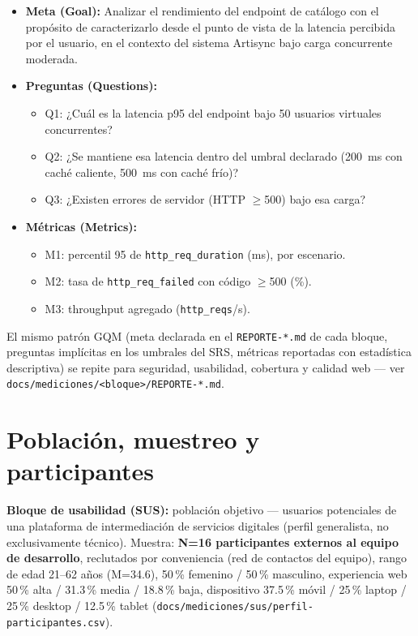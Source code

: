 \begin{itemize}
  \item \textbf{Meta (Goal):} Analizar el rendimiento del endpoint de
    catálogo con el propósito de caracterizarlo desde el punto de vista
    de la latencia percibida por el usuario, en el contexto del sistema
    Artisync bajo carga concurrente moderada.
  \item \textbf{Preguntas (Questions):}
    \begin{itemize}
      \item Q1: ¿Cuál es la latencia p95 del endpoint bajo 50 usuarios
        virtuales concurrentes?
      \item Q2: ¿Se mantiene esa latencia dentro del umbral declarado
        (200~ms con caché caliente, 500~ms con caché frío)?
      \item Q3: ¿Existen errores de servidor (HTTP $\geq$500) bajo esa
        carga?
    \end{itemize}
  \item \textbf{Métricas (Metrics):}
    \begin{itemize}
      \item M1: percentil 95 de \texttt{http\_req\_duration} (ms), por
        escenario.
      \item M2: tasa de \texttt{http\_req\_failed} con código $\geq$500
        (\%).
      \item M3: throughput agregado (\texttt{http\_reqs}/s).
    \end{itemize}
\end{itemize}

El mismo patrón GQM (meta declarada en el \texttt{REPORTE-*.md} de cada
bloque, preguntas implícitas en los umbrales del SRS, métricas reportadas
con estadística descriptiva) se repite para seguridad, usabilidad,
cobertura y calidad web --- ver \texttt{docs/mediciones/<bloque>/REPORTE-*.md}.

\section{Población, muestreo y participantes}

\textbf{Bloque de usabilidad (SUS):} población objetivo --- usuarios
potenciales de una plataforma de intermediación de servicios digitales
(perfil generalista, no exclusivamente técnico). Muestra: \textbf{N=16
participantes externos al equipo de desarrollo}, reclutados por
conveniencia (red de contactos del equipo), rango de edad 21--62 años
(M=34.6), 50\,\% femenino / 50\,\% masculino, experiencia web 50\,\% alta
/ 31.3\,\% media / 18.8\,\% baja, dispositivo 37.5\,\% móvil / 25\,\%
laptop / 25\,\% desktop / 12.5\,\% tablet
(\texttt{docs/mediciones/sus/perfil-participantes.csv}).

